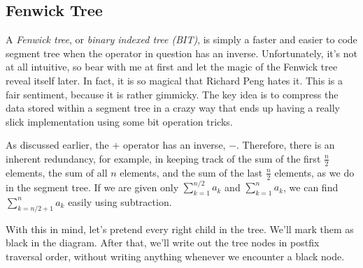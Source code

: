 \documentclass[11pt]{book}
\begin{document}
\subsection{Fenwick Tree}

A \textit{Fenwick tree}, or \textit{binary indexed tree (BIT)}, is simply a faster and easier to code segment tree when the operator in question has an inverse. Unfortunately, it's not at all intuitive, so bear with me at first and let the magic of the Fenwick tree reveal itself later. In fact, it is so magical that Richard Peng hates it. This is a fair sentiment, because it is rather gimmicky. The key idea is to compress the data stored within a segment tree in a crazy way that ends up having a really slick implementation using some bit operation tricks.

As discussed earlier, the $+$ operator has an inverse, $-$. Therefore, there is an inherent redundancy, for example, in keeping track of the sum of the first $\frac{n}{2}$ elements, the sum of all $n$ elements, and the sum of the last $\frac{n}{2}$ elements, as we do in the segment tree. If we are given only $\sum_{k=1}^{n/2} a_k$ and $\sum_{k=1}^n a_k$, we can find $\sum_{k=n/2+1}^{n} a_k$ easily using subtraction.

With this in mind, let's pretend every right child in the tree. We'll mark them as black in the diagram. After that, we'll write out the tree nodes in postfix traversal order, without writing anything whenever we encounter a black node.
\end{document}
